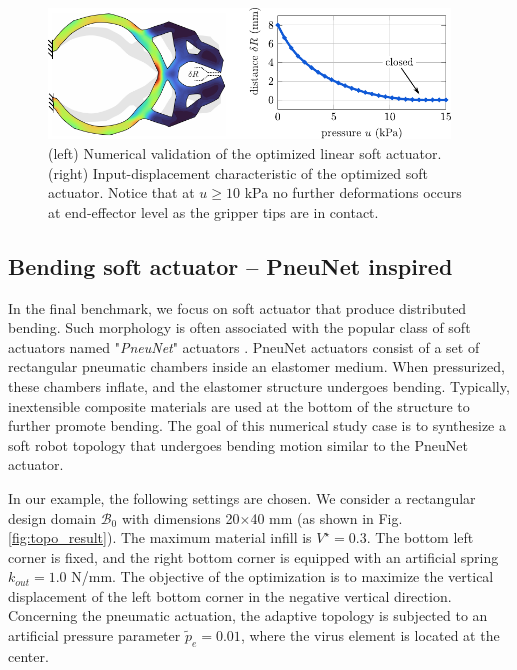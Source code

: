 \begin{figure}[!t]
  \centering
  \includegraphics*[width=0.95\textwidth]{./pdf/thesis-figure-3-6.pdf}
  \caption{(left) Numerical validation of the optimized linear soft actuator. (right) Input-displacement characteristic of the optimized soft actuator. Notice that at $u \ge 10$ \si{\kilo \pascal} no further deformations occurs at end-effector level as the gripper tips are in contact.}
  \label{fig:C3:topo_result_gripper_fem}
\end{figure}

\subsection{Bending soft actuator -- PneuNet inspired}
In the final benchmark, we focus on soft actuator that produce distributed bending. Such morphology is often associated with the popular class of soft actuators named "\emph{PneuNet}" actuators \cite{Polygerinos2013,Polygerinos2015,Galloway2016,Hughes2016Nov,Marchese2015}. PneuNet actuators consist of a set of rectangular pneumatic chambers inside an elastomer medium. When pressurized, these chambers inflate, and the elastomer structure undergoes bending. Typically, inextensible composite materials are used at the bottom of the structure to further promote bending. The goal of this numerical study case is to synthesize a soft robot topology that undergoes bending motion similar to the PneuNet actuator. 

In our example, the following settings are chosen. We consider a rectangular design domain $\mathcal{B}_0$ with dimensions 20$\times$40 mm (as shown in Fig. \ref{fig:topo_result}). The maximum material infill is $V^\star = 0.3$. The bottom left corner is fixed, and the right bottom corner is equipped with an artificial spring $k_{out} = 1.0$ N/mm. The objective of the optimization is to maximize the vertical displacement of the left bottom corner in the negative vertical direction. Concerning the pneumatic actuation, the adaptive topology is subjected to an artificial pressure parameter $\tilde{p}_e = 0.01$, where the virus element is located at the center.

